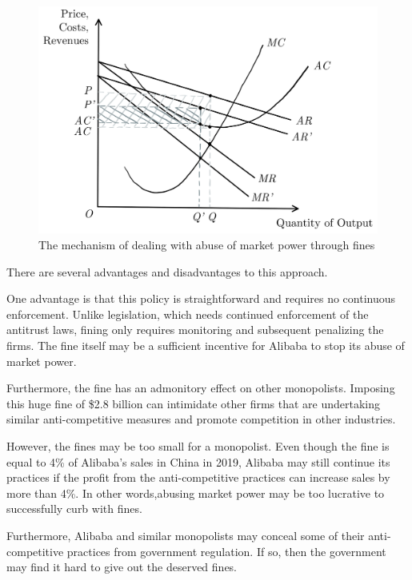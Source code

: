 \documentclass{article}
\begin{document}
\begin{figure}[htbp]
	\centering
	\includegraphics[width=0.6\linewidth]{fine.png}
	\caption{The mechanism of dealing with abuse of market power through fines}
	\label{fig:fine}
\end{figure}

\vspace{1cm}

There are several advantages and disadvantages to this approach.

One advantage is that this policy is straightforward and requires no continuous enforcement. Unlike legislation, which needs continued enforcement of the antitrust laws, fining only requires monitoring and subsequent penalizing the firms. The fine itself may be a sufficient incentive for Alibaba to stop its abuse of market power. 

Furthermore, the fine has an admonitory effect on other monopolists. Imposing this huge fine of \$2.8 billion can intimidate other firms that are undertaking similar anti-competitive measures and promote competition in other industries. 

However, the fines may be too small for a monopolist. Even though the fine is equal to 4\% of Alibaba's sales in China in 2019, Alibaba may still continue its practices if the profit from the anti-competitive practices can increase sales by more than 4\%. In other words,abusing market power may be too lucrative to successfully curb with fines.

Furthermore, Alibaba and similar monopolists may conceal some of their anti-competitive practices from government regulation. If so, then the government may find it hard to give out the deserved fines.
\end{document}
